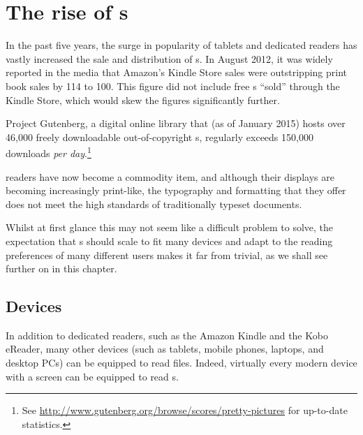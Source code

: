 \chapter{The rise of \ebook{}s} \label{ch:intro}


In the past five years, the surge in popularity of tablets and dedicated \ebook{} readers has vastly increased the sale and distribution of \ebook{}s. In August 2012, it was widely reported in the media\hspace{0pt}\cite{hexus.net2012} that Amazon's Kindle Store sales were outstripping print book sales by 114 to 100. This figure did not include free \ebook{}s ``sold'' through the Kindle Store, which would skew the figures significantly further.

Project Gutenberg, a digital online library that (as of January 2015) hosts over 46,000 freely downloadable out-of-copyright \ebook{}s, regularly exceeds 150,000 downloads \emph{per day}.\footnote{\raggedright See \url{http://www.gutenberg.org/browse/scores/pretty-pictures} for up-to-date statistics.}

\Ebook{} readers have now become a commodity item, and although their displays are becoming increasingly print-like, the typography and formatting that they offer does not meet the high standards of traditionally typeset documents.

Whilst at first glance this may not seem like a difficult problem to solve, the expectation that \ebook{}s should scale to fit many devices and adapt to the reading preferences of many different users makes it far from trivial, as we shall see further on in this chapter.

\section{Devices}

In addition to dedicated \ebook{} readers, such as the Amazon Kindle and the Kobo eReader, many other devices (such as tablets, mobile phones, laptops, and desktop PCs) can be equipped to read \ebook{} files. Indeed, virtually every modern device with a screen can be equipped to read \ebook{}s.

